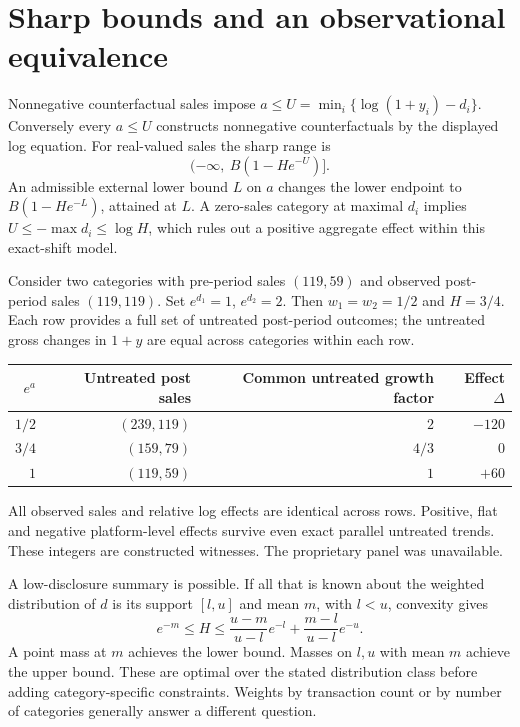 \documentclass[11pt,a4paper]{article}
\begin{document}
\newpage
\section*{Sharp bounds and an observational equivalence}
Nonnegative counterfactual sales impose $a\le U=\min_i\{\log(1+y_i)-d_i\}$. Conversely every $a\le U$ constructs nonnegative counterfactuals by the displayed log equation. For real-valued sales the sharp range is
\[
 (-\infty,\ B(1-He^{-U})].
\]
An admissible external lower bound $L$ on $a$ changes the lower endpoint to $B(1-He^{-L})$, attained at $L$. A zero-sales category at maximal $d_i$ implies $U\le-\max d_i\le\log H$, which rules out a positive aggregate effect within this exact-shift model.

Consider two categories with pre-period sales $(119,59)$ and observed post-period sales $(119,119)$. Set $e^{d_1}=1$, $e^{d_2}=2$. Then $w_1=w_2=1/2$ and $H=3/4$. Each row provides a full set of untreated post-period outcomes; the untreated gross changes in $1+y$ are equal across categories within each row.
\begin{center}\begin{tabular}{rrrr}\toprule
$e^a$ & Untreated post sales & Common untreated growth factor & Effect $\Delta$\\\midrule
$1/2$ & $(239,119)$ & $2$ & $-120$\\
$3/4$ & $(159,79)$ & $4/3$ & $0$\\
$1$   & $(119,59)$ & $1$ & $+60$\\\bottomrule
\end{tabular}\end{center}
All observed sales and relative log effects are identical across rows. Positive, flat and negative platform-level effects survive even exact parallel untreated trends. These integers are constructed witnesses. The proprietary panel was unavailable.

A low-disclosure summary is possible. If all that is known about the weighted distribution of $d$ is its support $[l,u]$ and mean $m$, with $l<u$, convexity gives
\[
 e^{-m}\le H\le \frac{u-m}{u-l}e^{-l}+\frac{m-l}{u-l}e^{-u}.
\]
A point mass at $m$ achieves the lower bound. Masses on $l,u$ with mean $m$ achieve the upper bound. These are optimal over the stated distribution class before adding category-specific constraints. Weights by transaction count or by number of categories generally answer a different question.
\end{document}
